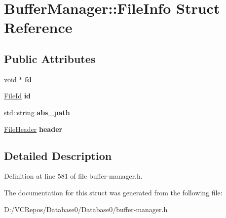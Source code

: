 \hypertarget{struct_buffer_manager_1_1_file_info}{}\section{Buffer\+Manager\+::File\+Info Struct Reference}
\label{struct_buffer_manager_1_1_file_info}
\subsection*{Public Attributes}
\begin{DoxyCompactItemize}
\item 
\mbox{\label{struct_buffer_manager_1_1_file_info_a1da00e0d025d3597d1da3ea19b77f237}} 
void $\ast$ {\bfseries fd}
\item 
\mbox{\label{struct_buffer_manager_1_1_file_info_ad676d44a1e8fe333132d97478304df4a}} 
\mbox{\hyperlink{struct_generic_i_o_id}{File\+Id}} {\bfseries id}
\item 
\mbox{\label{struct_buffer_manager_1_1_file_info_ab923801c01472d75e3d6cab62ab82ea8}} 
std\+::string {\bfseries abs\+\_\+path}
\item 
\mbox{\label{struct_buffer_manager_1_1_file_info_af6c5df179ba435080354a1d0a36472fc}} 
\mbox{\hyperlink{struct_buffer_manager_1_1_file_header}{File\+Header}} {\bfseries header}
\end{DoxyCompactItemize}


\subsection{Detailed Description}


Definition at line 581 of file buffer-\/manager.\+h.



The documentation for this struct was generated from the following file\+:\begin{DoxyCompactItemize}
\item 
D\+:/\+V\+C\+Repos/\+Database0/\+Database0/buffer-\/manager.\+h\end{DoxyCompactItemize}
